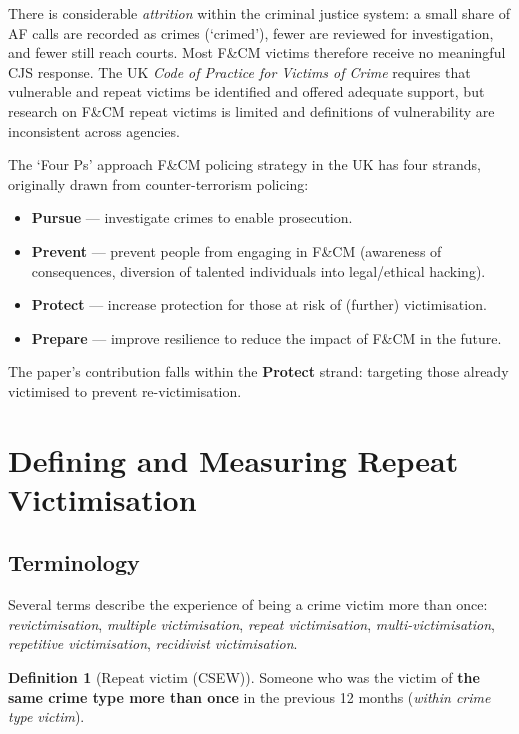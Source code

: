 \documentclass[11pt,a4paper,openany]{report}
\theoremstyle{definition}
\newtheorem{definition}{Definition}[chapter]
\theoremstyle{plain}
\theoremstyle{remark}
\begin{document}
There is considerable \textit{attrition} within the criminal justice system: a small share of AF calls are recorded as crimes (`crimed'), fewer are reviewed for investigation, and fewer still reach courts. Most F\&CM victims therefore receive no meaningful CJS response. The UK \textit{Code of Practice for Victims of Crime} requires that vulnerable and repeat victims be identified and offered adequate support, but research on F\&CM repeat victims is limited and definitions of vulnerability are inconsistent across agencies.

\begin{sidebox}{The `Four Ps' approach}
F\&CM policing strategy in the UK has four strands, originally drawn from counter-terrorism policing:
\begin{itemize}
    \item \textbf{Pursue} --- investigate crimes to enable prosecution.
    \item \textbf{Prevent} --- prevent people from engaging in F\&CM (awareness of consequences, diversion of talented individuals into legal/ethical hacking).
    \item \textbf{Protect} --- increase protection for those at risk of (further) victimisation.
    \item \textbf{Prepare} --- improve resilience to reduce the impact of F\&CM in the future.
\end{itemize}
The paper's contribution falls within the \textbf{Protect} strand: targeting those already victimised to prevent re-victimisation.
\end{sidebox}

\section{Defining and Measuring Repeat Victimisation}

\subsection{Terminology}

Several terms describe the experience of being a crime victim more than once: \textit{revictimisation}, \textit{multiple victimisation}, \textit{repeat victimisation}, \textit{multi-victimisation}, \textit{repetitive victimisation}, \textit{recidivist victimisation}.

\begin{definition}[Repeat victim (CSEW)]
Someone who was the victim of \textbf{the same crime type more than once} in the previous 12 months (\textit{within crime type victim}).
\end{definition}
\end{document}
